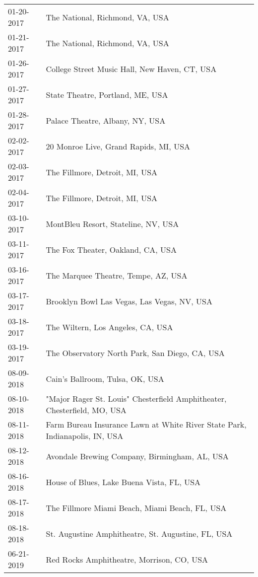 \begin{supertabular}{ll}
 01-20-2017 &                                              The National, Richmond, VA, USA \\
 01-21-2017 &                                              The National, Richmond, VA, USA \\
 01-26-2017 &                                College Street Music Hall, New Haven, CT, USA \\
 01-27-2017 &                                             State Theatre, Portland, ME, USA \\
 01-28-2017 &                                              Palace Theatre, Albany, NY, USA \\
 02-02-2017 &                                        20 Monroe Live, Grand Rapids, MI, USA \\
 02-03-2017 &                                               The Fillmore, Detroit, MI, USA \\
 02-04-2017 &                                               The Fillmore, Detroit, MI, USA \\
 03-10-2017 &                                          MontBleu Resort, Stateline, NV, USA \\
 03-11-2017 &                                            The Fox Theater, Oakland, CA, USA \\
 03-16-2017 &                                          The Marquee Theatre, Tempe, AZ, USA \\
 03-17-2017 &                                  Brooklyn Bowl Las Vegas, Las Vegas, NV, USA \\
 03-18-2017 &                                            The Wiltern, Los Angeles, CA, USA \\
 03-19-2017 &                               The Observatory North Park, San Diego, CA, USA \\
 08-09-2018 &                                              Cain's Ballroom, Tulsa, OK, USA \\
 08-10-2018 &     "Major Rager St. Louis" Chesterfield Amphitheater, Chesterfield, MO, USA \\
 08-11-2018 &  Farm Bureau Insurance Lawn at White River State Park, Indianapolis, IN, USA \\
 08-12-2018 &                                Avondale Brewing Company, Birmingham, AL, USA \\
 08-16-2018 &                                    House of Blues, Lake Buena Vista, FL, USA \\
 08-17-2018 &                               The Fillmore Miami Beach, Miami Beach, FL, USA \\
 08-18-2018 &                           St. Augustine Amphitheatre, St. Augustine, FL, USA \\
 06-21-2019 &                                    Red Rocks Amphitheatre, Morrison, CO, USA \\
\end{supertabular}
